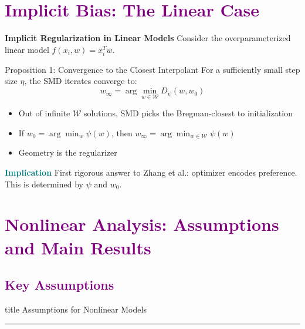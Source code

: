 \documentclass[aspectratio=169]{beamer}
\begin{document}
\section{\textbf{\textcolor{purple}{Implicit Bias: The Linear Case}}}
\begin{frame}{\textcolor{cmindsblue}{\textbf{Implicit Regularization in Linear Models}}}
    Consider the overparameterized linear model $f(x_i, w) = x_i^T w$.
    
    \begin{block}{Proposition 1: Convergence to the Closest Interpolant}
        For a sufficiently small step size $\eta$, the SMD iterates converge to:
        \begin{equation}
            w_\infty = \arg\min_{w \in \mathcal{W}} D_\psi(w, w_0)
        \end{equation}
    \end{block}

    \begin{itemize}
        \item Out of infinite $\mathcal{W}$ solutions, SMD picks the Bregman-closest to initialization
        \item If $w_0 = \arg\min_w \psi(w)$, then $w_\infty = \arg\min_{w \in \mathcal{W}} \psi(w)$
        \item Geometry is the regularizer
    \end{itemize}
    
    \begin{block}{\textbf{\textcolor{teal}{Implication}}}
    First rigorous answer to Zhang et al.: optimizer encodes preference. This is determined by $\psi$ and $w_0$.
    \end{block}
\end{frame}

\section{\textbf{\textcolor{purple}{Nonlinear Analysis: Assumptions and Main Results}}}

\subsection{\textbf{\textcolor{purple}{Key Assumptions}}}
\begin{frame}[plain]
    \vfill
    \centering
    \begin{beamercolorbox}[sep=8pt,center,shadow=true,rounded=true]{title}
        Assumptions for Nonlinear Models\par%
        \color{oxfordblue}\noindent\rule{10cm}{1pt}
    \end{beamercolorbox}
    \vfill
\end{frame}
\end{document}
